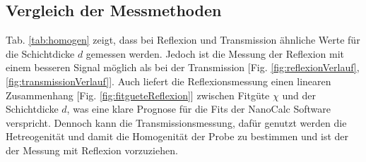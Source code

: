 \subsection{Vergleich der Messmethoden}
\label{sub:vergleich}

Tab. \ref{tab:homogen} zeigt, dass bei Reflexion und Transmission ähnliche Werte für die Schichtdicke $d$ gemessen werden. Jedoch ist die Messung der Reflexion mit einem besseren Signal möglich als bei der Transmission [Fig. \ref{fig:reflexionVerlauf}, \ref{fig:transmissionVerlauf}]. Auch liefert die Reflexionsmessung einen linearen Zusammenhang [Fig. \ref{fig:fitgueteReflexion}] zwischen Fitgüte $\chi$ und der Schichtdicke $d$, was eine klare Prognose für die Fits der NanoCalc Software verspricht. Dennoch kann die Transmissionsmessung, dafür genutzt werden die Hetreogenität und damit die Homogenität der Probe zu bestimmen und ist der der Messung mit Reflexion vorzuziehen.
